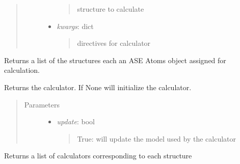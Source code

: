 \documentclass[letterpaper,10pt,english]{sphinxmanual}
\begin{document}
\begin{fulllineitems}
\begin{fulllineitems}
\begin{quote}
\begin{description}
\begin{itemize}
\begin{quote}
structure to calculate
\end{quote}

\item {} 
\emph{kwargs}: dict
\begin{quote}

directives for calculator
\end{quote}

\end{itemize}

\end{description}\end{quote}

\end{fulllineitems}


\begin{fulllineitems}
\label{classes:catcalc.CATCalc.get_atoms}
Returns a list of the structures each an ASE Atoms object
assigned for calculation.

\end{fulllineitems}


\begin{fulllineitems}
\label{classes:catcalc.CATCalc.get_calculator}
Returns the calculator. If None will initialize 
the calculator.
\begin{quote}\begin{description}
\item[{Parameters}] \leavevmode\begin{itemize}
\item {} 
\emph{update}: bool
\begin{quote}

True: will update the model used by the calculator
\end{quote}

\end{itemize}

\end{description}\end{quote}

\end{fulllineitems}


\begin{fulllineitems}
\label{classes:catcalc.CATCalc.get_calculators}
Returns a list of calculators corresponding to each structure


\end{fulllineitems}
\end{fulllineitems}
\end{document}
